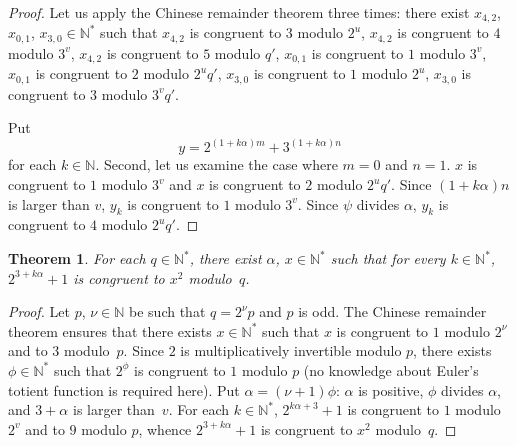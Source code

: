 \documentclass[12pt]{article}
\newcommand{\bN}{\mathbb{N}} %
\newcommand{\bNast}{\bN^*}
\newtheorem{theorem}{Theorem}
\theoremstyle{definition}
\begin{document}
\begin{proof}
    Let us apply the Chinese remainder theorem three times:
    there exist $x_{4, 2}$, $x_{0, 1}$, $x_{3, 0} \in \bNast$ such that
    $x_{4, 2}$ is congruent to $3$ modulo $2^u$,
    $x_{4, 2}$ is congruent to $4$ modulo $3^v$, 
    $x_{4, 2}$ is congruent to $5$ modulo $q'$,
    $x_{0, 1}$ is congruent to $1$ modulo $3^v$,
    $x_{0, 1}$ is congruent to $2$ modulo $2^u q'$,
    $x_{3, 0}$ is congruent to $1$ modulo $2^u$,
    $x_{3, 0}$ is congruent to $3$ modulo $3^v q'$.
    
    
    Put
    $$
    y = 2^{(1 + k \alpha)m} + 3^{(1 + k \alpha)n}
    $$
    for each $k \in \bN$.
    Second, let us examine the case where $m = 0$ and $n = 1$.
    $x$ is congruent to $1$ modulo $3^v$ and 
    $x$ is congruent to $2$ modulo $2^u q'$.
    Since $(1 + k \alpha) n$ is larger than $v$,
    $y_k$ is congruent to $1$ modulo $3^v$.
    Since $\psi$ divides $\alpha$,
    $y_k$ is congruent to $4$ modulo $2^u q'$.
   \end{proof} 

   \begin{theorem} \label{thm:pow-2-square-mod}
     For each $q \in \bNast$,
     there exist $\alpha$, $x \in \bNast$ such that for every $k \in \bNast$, 
     $2^{3 + k \alpha} + 1$ is congruent to $x^2$ modulo~$q$.
   \end{theorem}

   \begin{proof}
     Let $p$, $\nu \in \bN$ be such that $q = 2^\nu p$ and $p$ is odd.
     The Chinese remainder theorem ensures that there exists $x \in \bNast$ such that
     $x$ is congruent to $1$ modulo $2^\nu$ and to $3$ modulo~$p$.
     Since $2$ is multiplicatively invertible modulo $p$,
     there exists $\phi \in \bNast$ such that $2^\phi$ is congruent to $1$ modulo $p$
     (no knowledge about Euler's totient function is required here).
     Put $\alpha = (\nu + 1) \phi$:
     $\alpha$ is positive,
     $\phi$ divides $\alpha$, and
     $3 + \alpha$ is larger than~$v$.
     For each $k \in \bNast$,
     $2^{k \alpha + 3} + 1$ is congruent
     to $1$ modulo $2^v$ and
     to $9$ modulo $p$,
     whence $2^{3 + k \alpha} + 1$ is congruent to $x^2$ modulo~$q$.
   \end{proof}
     
\end{document}
